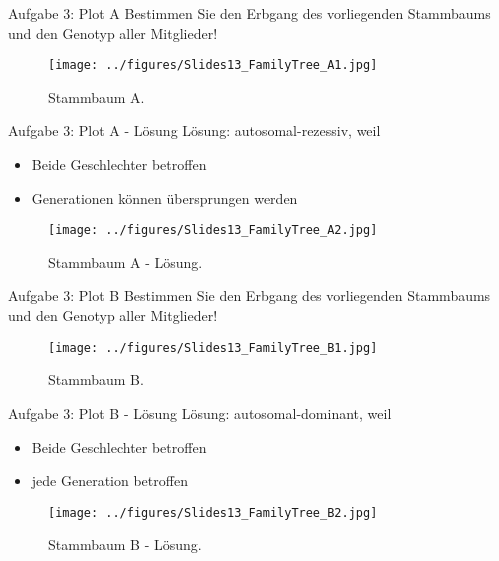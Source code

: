 \documentclass{beamer}
\begin{document}
\begin{frame}{Aufgabe 3: Plot A}
Bestimmen Sie den Erbgang des vorliegenden Stammbaums und den Genotyp aller Mitglieder!

\begin{figure}[h]
\begin{center}
\texttt{[image: ../figures/Slides13\_FamilyTree\_A1.jpg]}
\caption{Stammbaum A.}
\label{fig:tree_A1}
\end{center}
\end{figure}    
\end{frame}

\begin{frame}{Aufgabe 3: Plot A - Lösung}
Lösung: autosomal-rezessiv, weil

\begin{itemize}
    \item Beide Geschlechter betroffen
    \item Generationen können übersprungen werden  
\end{itemize}

\begin{figure}[h]
\begin{center}
\texttt{[image: ../figures/Slides13\_FamilyTree\_A2.jpg]}
\caption{Stammbaum A - Lösung.}
\label{fig:tree_A2}
\end{center}
\end{figure}    
\end{frame}

\begin{frame}{Aufgabe 3: Plot B}
Bestimmen Sie den Erbgang des vorliegenden Stammbaums und den Genotyp aller Mitglieder!

\begin{figure}[h]
\begin{center}
\texttt{[image: ../figures/Slides13\_FamilyTree\_B1.jpg]}
\caption{Stammbaum B.}
\label{fig:tree_B1}
\end{center}
\end{figure}    
\end{frame}

\begin{frame}{Aufgabe 3: Plot B - Lösung}
Lösung: autosomal-dominant, weil

\begin{itemize}
    \item Beide Geschlechter betroffen
    \item jede Generation betroffen  
\end{itemize}

\begin{figure}[h]
\begin{center}
\texttt{[image: ../figures/Slides13\_FamilyTree\_B2.jpg]}
\caption{Stammbaum B - Lösung.}
\label{fig:tree_B2}
\end{center}
\end{figure}    
\end{frame}
\end{document}
